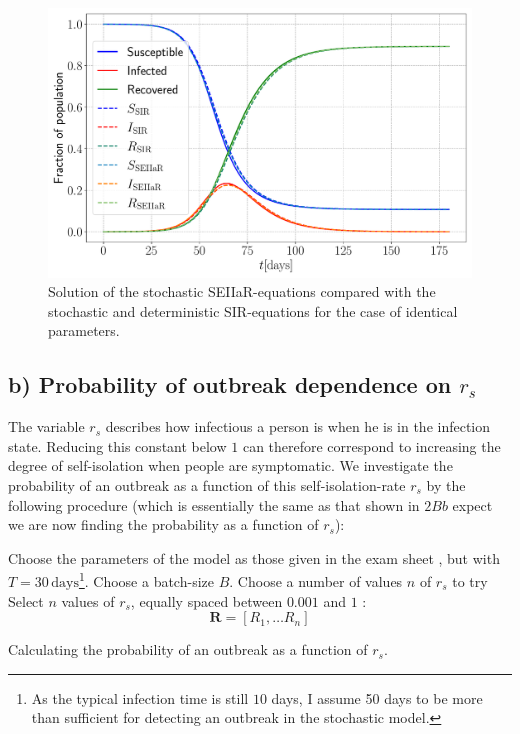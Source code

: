 \begin{figure}[h!]
	\centering
	\includegraphics[width=0.8\columnwidth]{../fig/test_comparison.pdf}
	\caption{Solution of the stochastic SEIIaR-equations compared with the stochastic and deterministic SIR-equations for the case of identical parameters.}
	\label{fig:comparison_SIR}
\end{figure}
\newpage

\subsection{b) Probability of outbreak dependence on $r_s$}

The variable $r_s$ describes how infectious a person is when he is in the infection state. Reducing this constant below $1$ can therefore correspond to increasing the degree of self-isolation when people are symptomatic. We investigate the probability of an outbreak as a function of this self-isolation-rate $r_s$ by the following procedure (which is essentially the same as that shown in $2Bb$ expect we are now finding the probability as a function of $r_s$): 

\begin{algorithm}[H]
	Choose the parameters of the model as those given in the exam sheet \cite{sheet}, but with $T = 30 \, \mathrm{days}$\footnote{As the typical infection time is still $10$ days, I assume 50 days to be more than sufficient for detecting an outbreak in the stochastic model.}. \;
	Choose a batch-size $B$.\;
	Choose a number of values $n$ of $r_s$ to try\;
	Select $n$ values of $r_s$, equally spaced between $0.001$ and $1$ :
		$$
			\mathbf{R} = [R_1, \dots R_n]
		$$
	\caption{Calculating the probability of an outbreak as a function of $r_s$.}
\end{algorithm} 

